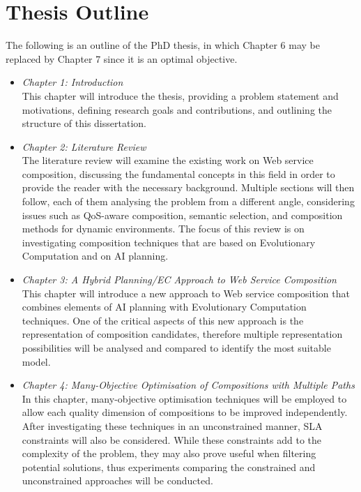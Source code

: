 \section{Thesis Outline}

The following is an outline of the PhD thesis,  in which Chapter 6 may be replaced by Chapter 7 since it is an optimal objective.

\begin{itemize}
 \item \textit{Chapter 1: Introduction}\\
 This chapter will introduce the thesis, providing a problem statement and motivations, defining research goals and contributions, and outlining the structure of this dissertation.
 \item \textit{Chapter 2: Literature Review}\\
 The literature review will examine the existing work on Web service composition, discussing the fundamental concepts in this field in order to provide the reader with the necessary background. Multiple sections will then follow, each of them analysing the problem from a different angle, considering issues such as QoS-aware composition, semantic selection, and composition methods for dynamic environments. The focus of this review is on investigating composition techniques that are based on Evolutionary Computation and on AI planning.
 \item \textit{Chapter 3: A Hybrid Planning/EC Approach to Web Service Composition}\\
 This chapter will introduce a new approach to Web service composition that combines elements of AI planning with Evolutionary Computation techniques. One of the critical aspects of this new approach is the representation of composition candidates, therefore multiple representation possibilities will be analysed and compared to identify the most suitable model. 
 \item \textit{Chapter 4: Many-Objective Optimisation of Compositions with Multiple Paths}\\
 In this chapter, many-objective optimisation techniques will be employed to allow each quality dimension of compositions to be improved independently. After investigating these techniques in an unconstrained manner, SLA constraints will also be considered. While these constraints add to the complexity of the problem, they may also prove useful when filtering potential solutions, thus experiments comparing the constrained and unconstrained approaches will be conducted.

\end{itemize}
